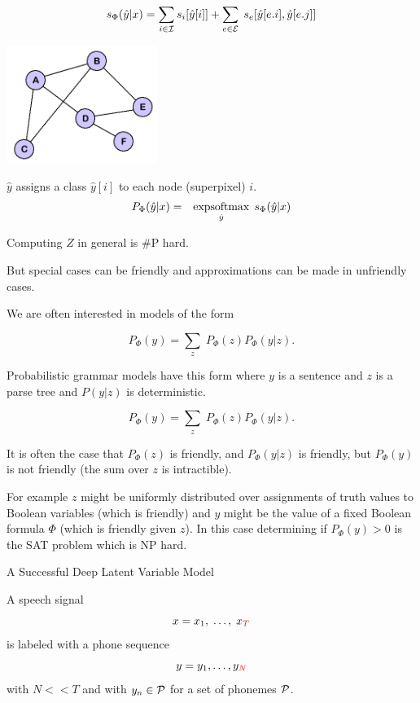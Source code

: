 {\vfill
{\color{red} $$s_\Phi(\hat{y}|x) = \sum_{i \in {\cal I}} s_i[\hat{y}[i]] + \sum_{e \in {\cal E}}\;s_e[\hat{y}[e.i],\hat{y}[e.j]]$$}

\bigskip
\centerline{\includegraphics[height= 1.5in]{../images/Graph}}
\medskip
$\hat{y} $ assigns a class $\hat{y}[i]$ to each node (superpixel) $i$.
\bigskip
\bigskip
{\color{red}
\begin{eqnarray*}
P_\Phi(\hat{y}|x) & = & \operatorname*{expsoftmax}_{\hat{y}}\;s_\Phi(\hat{y}|x)
\end{eqnarray*}
}

\vfill
Computing $Z$ in general is \#P hard.

\vfill
{\color{red} But special cases can be friendly and approximations can be made in unfriendly cases.}


We are often interested in models of the form

\vfill
{\color{red} $$P_\Phi(y) = \sum_z\;P_\Phi(z)P_\Phi(y|z).$$}

\vfill
Probabilistic grammar models have this form where $y$ is a sentence and $z$ is a parse tree
and $P(y|z)$ is deterministic.


{\color{red} $$P_\Phi(y) = \sum_z\;P_\Phi(z)P_\Phi(y|z).$$}

\vfill
It is often the case that $P_\Phi(z)$ is friendly, and $P_\Phi(y|z)$ is friendly, but $P_\Phi(y)$ is not friendly (the sum over $z$ is intractible).

\vfill
For example $z$ might be uniformly distributed over assignments of truth values to Boolean variables (which is friendly) and $y$ might be the value of a fixed Boolean formula $\Phi$ (which is friendly given $z$).  In this case
determining if $P_\Phi(y) > 0$ is the SAT problem which is NP hard.

{A Successful Deep Latent Variable Model}

A speech signal
$$x = x_1,\; \ldots,\; x_{\color{red} T}$$
is labeled with a phone sequence
$$y = y_1, \ldots, y_{\color{red} N}$$
with {\color{red} $N << T$} and with $y_n \in {\cal P}$ for a set of phonemes ${\cal P}$.

}
